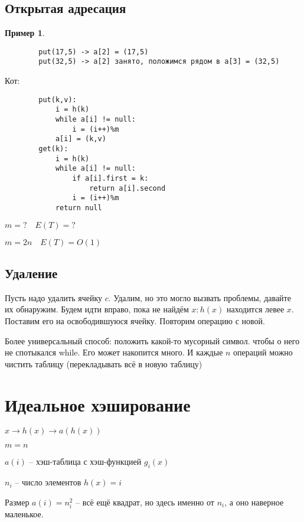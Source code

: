 \documentclass{book}
\theoremstyle{definition}
\newtheorem*{example}{Пример}
\begin{document}
\subsection{Открытая адресация}

\begin{example}
    \begin{verbatim}
        put(17,5) -> a[2] = (17,5)
        put(32,5) -> a[2] занято, положимся рядом в a[3] = (32,5)
    \end{verbatim}

    Кот:
    \begin{verbatim}
        put(k,v):
            i = h(k)
            while a[i] != null:
                i = (i++)%m 
            a[i] = (k,v)
        get(k):
            i = h(k)
            while a[i] != null:
                if a[i].first = k:
                    return a[i].second
                i = (i++)%m
            return null
    \end{verbatim}

    $m = ?\quad E(T) = ?$

    $m=2n\quad E(T) = O(1)$
\end{example}

\subsection{Удаление}

Пусть надо удалить ячейку $c$. Удалим, но это могло вызвать проблемы, давайте их обнаружим. Будем идти вправо, пока не найдём  $x:h(x)$ находится левее  $x$. Поставим его на освободившуюся ячейку. Повторим операцию с новой.

Более универсальный способ: положить какой-то мусорный символ. чтобы о него не спотыкался while. Его может накопится много. И каждые $n$ операций можно чистить таблицу (перекладывать всё в новую таблицу)

\section{Идеальное хэширование}

$x \to h(x) \to a(h(x))$

$m=n$

$a(i)$ -- хэш-таблица с хэш-функцией  $g_i(x)$

$n_i$ -- число элементов  $h(x) = i$

Размер  $a(i) = n_i^2$ -- всё ещё квадрат, но здесь именно от  $n_i$, а оно наверное маленькое.
\end{document}
